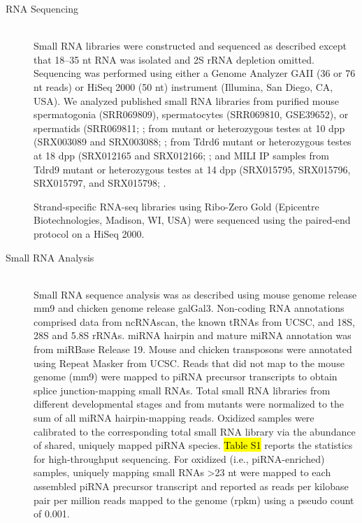 \begin{description}
    \item[RNA Sequencing] \hfill \\
    Small RNA libraries were constructed and sequenced as described \citep{Ghildiyal2008, Seitz2008} except that 18–35 nt RNA was isolated and 2S rRNA depletion omitted. Sequencing was performed using either a Genome Analyzer GAII (36 or 76 nt reads) or HiSeq 2000 (50 nt) instrument (Illumina, San Diego, CA, USA). We analyzed published small RNA libraries from purified mouse spermatogonia (SRR069809), spermatocytes (SRR069810, GSE39652), or spermatids (SRR069811; \citep{Gan2011, Modzelewski2012}; from \mili{} mutant or heterozygous testes at 10 dpp (SRX003089 and SRX003088; \citep{Aravin2008a}; from Tdrd6 mutant or heterozygous testes at 18 dpp (SRX012165 and SRX012166; \citep{Vagin2009}; and MILI IP samples from Tdrd9 mutant or heterozygous testes at 14 dpp (SRX015795, SRX015796, SRX015797, and SRX015798; \citep{Shoji2009}.

    Strand-specific RNA-seq libraries \citep{Zhang2012} using Ribo-Zero Gold (Epicentre Biotechnologies, Madison, WI, USA) were sequenced using the paired-end protocol on a HiSeq 2000.
    
    \item[Small RNA Analysis] \hfill \\
    Small RNA sequence analysis was as described \citep{Li2009a} using mouse genome release mm9 and chicken genome release galGal3. Non-coding RNA annotations comprised data from ncRNAscan, the known tRNAs from UCSC, and 18S, 28S and 5.8S rRNAs. miRNA hairpin and mature miRNA annotation was from miRBase Release 19. Mouse and chicken transposons were annotated using Repeat Masker from UCSC. Reads that did not map to the mouse genome (mm9) were mapped to piRNA precursor transcripts to obtain splice junction-mapping small RNAs. Total small RNA libraries from different developmental stages and from mutants were normalized to the sum of all miRNA hairpin-mapping reads. Oxidized samples were calibrated to the corresponding total small RNA library via the abundance of shared, uniquely mapped piRNA species. \hl{Table S1} reports the statistics for high-throughput sequencing. For oxidized (i.e., piRNA-enriched) samples, uniquely mapping small RNAs >23 nt were mapped to each assembled piRNA precursor transcript and reported as reads per kilobase pair per million reads mapped to the genome (rpkm) using a pseudo count of 0.001.


\end{description}
